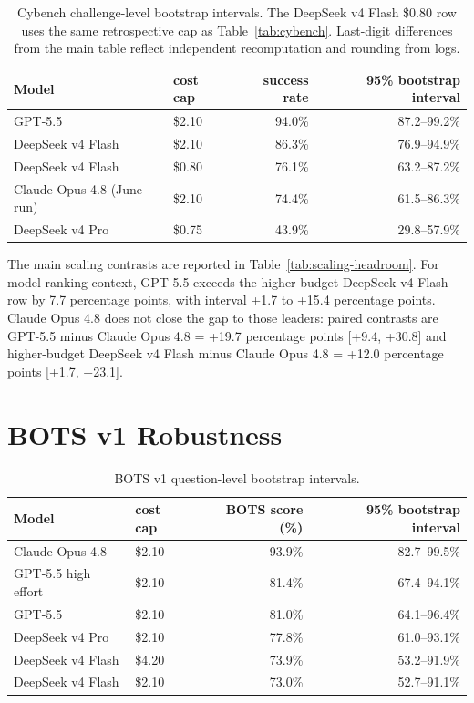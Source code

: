 \documentclass{jmlr}%
\begin{document}
\begin{table}[htbp]
\centering
\caption{Cybench challenge-level bootstrap intervals. The DeepSeek v4 Flash \$0.80 row uses the same retrospective cap as Table~\ref{tab:cybench}. Last-digit differences from the main table reflect independent recomputation and rounding from logs.}
\label{tab:cybench-bootstrap}
\small
\begin{tabular*}{\linewidth}{@{\extracolsep{\fill}}llrr@{}}
\toprule
Model & cost cap & success rate & 95\% bootstrap interval \\
\midrule
GPT-5.5 & \$2.10 & 94.0\% & 87.2--99.2\% \\
DeepSeek v4 Flash & \$2.10 & 86.3\% & 76.9--94.9\% \\
DeepSeek v4 Flash & \$0.80 & 76.1\% & 63.2--87.2\% \\
Claude Opus 4.8 (June run) & \$2.10 & 74.4\% & 61.5--86.3\% \\
DeepSeek v4 Pro & \$0.75 & 43.9\% & 29.8--57.9\% \\
\bottomrule
\end{tabular*}
\end{table}

The main scaling contrasts are reported in Table~\ref{tab:scaling-headroom}.
For model-ranking context, GPT-5.5 exceeds the higher-budget DeepSeek v4 Flash row by 7.7 percentage points, with interval +1.7 to +15.4 percentage points.
Claude Opus 4.8 does not close the gap to those leaders: paired contrasts are GPT-5.5 minus Claude Opus 4.8 = +19.7 percentage points [+9.4, +30.8] and higher-budget DeepSeek v4 Flash minus Claude Opus 4.8 = +12.0 percentage points [+1.7, +23.1].

\section{BOTS v1 Robustness}
\label{app:bots-robustness}

\begin{table}[htbp]
\centering
\caption{BOTS v1 question-level bootstrap intervals.}
\label{tab:bots-bootstrap}
\small
\begin{tabular*}{\linewidth}{@{\extracolsep{\fill}}llrr@{}}
\toprule
Model & cost cap & BOTS score (\%) & 95\% bootstrap interval \\
\midrule
Claude Opus 4.8 & \$2.10 & 93.9\% & 82.7--99.5\% \\
GPT-5.5 high effort & \$2.10 & 81.4\% & 67.4--94.1\% \\
GPT-5.5 & \$2.10 & 81.0\% & 64.1--96.4\% \\
DeepSeek v4 Pro & \$2.10 & 77.8\% & 61.0--93.1\% \\
DeepSeek v4 Flash & \$4.20 & 73.9\% & 53.2--91.9\% \\
DeepSeek v4 Flash & \$2.10 & 73.0\% & 52.7--91.1\% \\
\bottomrule
\end{tabular*}
\end{table}
\end{document}
